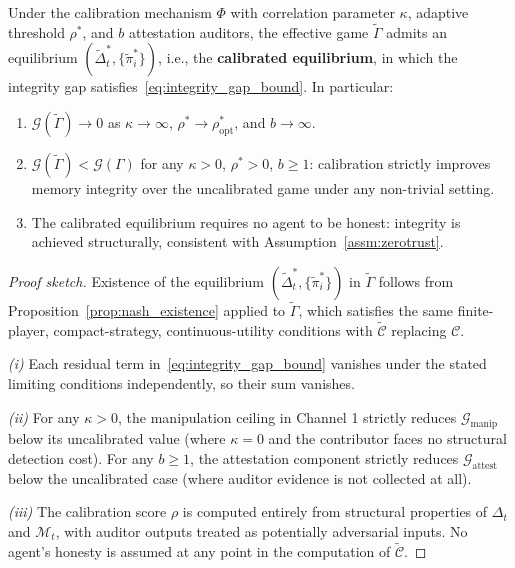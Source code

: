\begin{proposition}
\label{prop:calibrated_eq}
Under the calibration mechanism $\Phi$ with correlation parameter
$\kappa$, adaptive threshold $\rho^*$, and $b$ attestation auditors,
the effective game $\tilde{\Gamma}$ admits an equilibrium
$(\tilde{\Delta}_t^*, \{\tilde{\pi}_i^*\})$, i.e., the
\textbf{calibrated equilibrium}, in which the integrity gap
satisfies~\eqref{eq:integrity_gap_bound}. In particular:
\begin{enumerate}[label=(\roman*)]
    \item $\mathcal{G}(\tilde{\Gamma}) \to 0$ as $\kappa \to \infty$,
    $\rho^* \to \rho^*_{\text{opt}}$, and $b \to \infty$.
    \item $\mathcal{G}(\tilde{\Gamma}) < \mathcal{G}(\Gamma)$ for any
    $\kappa > 0$, $\rho^* > 0$, $b \geq 1$: calibration strictly
    improves memory integrity over the uncalibrated game under any
    non-trivial setting.
    \item The calibrated equilibrium requires no agent to be honest:
    integrity is achieved structurally, consistent with
    Assumption~\ref{assm:zerotrust}.
\end{enumerate}
\end{proposition}

\begin{proof}[Proof sketch]
Existence of the equilibrium $(\tilde{\Delta}_t^*, \{\tilde{\pi}_i^*\})$
in $\tilde{\Gamma}$ follows from Proposition~\ref{prop:nash_existence}
applied to $\tilde{\Gamma}$, which satisfies the same finite-player,
compact-strategy, continuous-utility conditions with $\tilde{\mathcal{C}}$
replacing $\mathcal{C}$.

\textit{(i)} Each residual term in~\eqref{eq:integrity_gap_bound}
vanishes under the stated limiting conditions independently, so their
sum vanishes.

\textit{(ii)} For any $\kappa > 0$, the manipulation ceiling in
Channel 1 strictly reduces $\mathcal{G}_{\text{manip}}$ below its
uncalibrated value (where $\kappa = 0$ and the contributor faces no
structural detection cost). For any $b \geq 1$, the attestation
component strictly reduces $\mathcal{G}_{\text{attest}}$ below the
uncalibrated case (where auditor evidence is not collected at all).

\textit{(iii)} The calibration score $\rho$ is computed entirely from
structural properties of $\Delta_t$ and $\mathcal{M}_t$, with auditor
outputs treated as potentially adversarial inputs. No agent's honesty
is assumed at any point in the computation of $\tilde{\mathcal{C}}$.
\end{proof}

